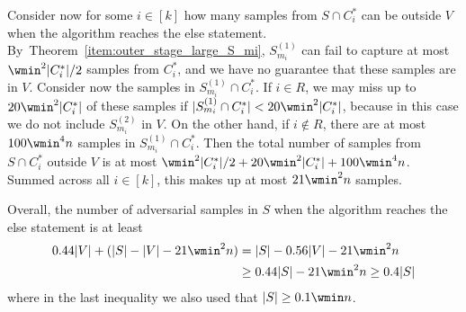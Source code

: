 Consider now for some $i \in [k]$ how many samples from $S \cap C_i^*$ can be outside $V$ when the algorithm reaches the else statement.
By~Theorem~\ref{item:outer_stage_large_S_mi}, $S_{m_i}^{(1)}$ can fail to capture at most $\wmin^2|C_i^*|/2$ samples from $C_i^*$, and we have no guarantee that these samples are in $V$.
Consider now the samples in $S_{m_i}^{(1)} \cap C_i^*$.
If $i \in R$, we may miss up to $20 \wmin^2 |C_i^*|$ of these samples if $|S_{m_i}^{(1)} \cap C_i^*| < 20 \wmin^2 |C_i^*|$, because in this case we do not include $S_{m_i}^{(2)}$ in $V$.
On the other hand, if $i \not\in R$, there are at most $100\wmin^4 n$ samples in $S_{m_i}^{(1)} \cap C_i^*$. 
Then the total number of samples from $S \cap C_i^*$ outside $V$ is at most $ \wmin^2 |C_i^*|/2 + 20\wmin^2|C_i^*| + 100\wmin^4 n$.
Summed across all $i \in [k]$, this makes up at most $21 \wmin^2 n$ samples.

Overall, the number of adversarial samples in $S$ when the algorithm reaches the else statement is at least
\begin{equation*}
    \begin{aligned}
    0.44 |V| + (|S| - |V| - 21 \wmin^2 n) &= |S| - 0.56 |V| - 21 \wmin^2 n \\
    & \geq 0.44|S| - 21 \wmin^2 n \geq 0.4 |S|
    \end{aligned}
\end{equation*}
where in the last inequality we also used that $|S| \geq 0.1 \wmin n$.



